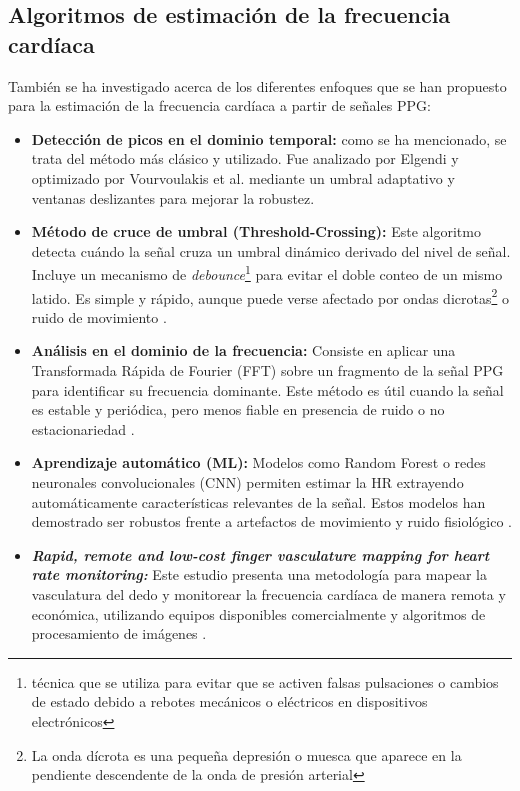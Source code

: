 \subsection{Algoritmos de estimación de la frecuencia cardíaca}

También se ha investigado acerca de los diferentes enfoques que se han propuesto para la estimación de la frecuencia cardíaca a partir de señales PPG:

\begin{itemize}
  \item \textbf{Detección de picos en el dominio temporal:} como se ha mencionado, se trata del método más clásico y utilizado. Fue analizado por Elgendi \cite{elgendi2012analysis} y optimizado por Vourvoulakis et al. \cite{9493400} mediante un umbral adaptativo y ventanas deslizantes para mejorar la robustez.

  \item \textbf{Método de cruce de umbral (Threshold-Crossing):} Este algoritmo detecta cuándo la señal cruza un umbral dinámico derivado del nivel de señal. Incluye un mecanismo de \textit{debounce}\footnote{técnica que se utiliza para evitar que se activen falsas pulsaciones o cambios de estado debido a rebotes mecánicos o eléctricos en dispositivos electrónicos} para evitar el doble conteo de un mismo latido. Es simple y rápido, aunque puede verse afectado por ondas dicrotas\footnote{La onda dícrota es una pequeña depresión o muesca que aparece en la pendiente descendente de la onda de presión arterial} o ruido de movimiento \cite{renesas2022ob1203}.

  \item \textbf{Análisis en el dominio de la frecuencia:} Consiste en aplicar una Transformada Rápida de Fourier (FFT) sobre un fragmento de la señal PPG para identificar su frecuencia dominante. Este método es útil cuando la señal es estable y periódica, pero menos fiable en presencia de ruido o no estacionariedad \cite{electronics3020282}.

  \item \textbf{Aprendizaje automático (ML):} Modelos como Random Forest o redes neuronales convolucionales (CNN) permiten estimar la HR extrayendo automáticamente características relevantes de la señal. Estos modelos han demostrado ser robustos frente a artefactos de movimiento y ruido fisiológico \cite{biswas2019cornet}.

  \item \textit{\textbf{Rapid, remote and low-cost finger vasculature mapping for heart rate monitoring: }}Este estudio presenta una metodología para mapear la vasculatura del dedo y monitorear la frecuencia cardíaca de manera remota y económica, utilizando equipos disponibles comercialmente y algoritmos de procesamiento de imágenes \cite{kallepalli2022finger}.
\end{itemize}


